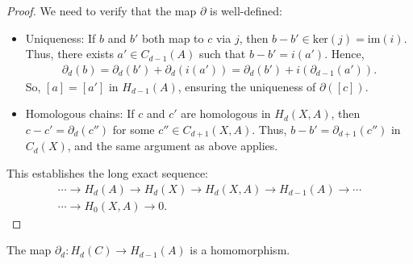 \begin{proof}
We need to verify that the map \(\partial\) is well-defined:
\begin{itemize}
    \item Uniqueness: If \(b\) and \(b'\) both map to \(c\) via \(j\), then \(b - b' \in \mathrm{ker}(j) = \mathrm{im}(i)\). Thus, there exists \(a' \in C_{d-1}(A)\) such that \(b - b' = i(a')\). Hence,
    \begin{align}
    \partial_{d}(b) = \partial_{d}(b') + \partial_{d}(i(a')) = \partial_{d}(b') + i(\partial_{d-1}(a')).
    \end{align}
    So, \([a] = [a']\) in \(H_{d-1}(A)\), ensuring the uniqueness of \(\partial([c])\).

    \item Homologous chains: If \(c\) and \(c'\) are homologous in \(H_{d}(X, A)\), then \(c - c' = \partial_{d}(c'')\) for some \(c'' \in C_{d+1}(X, A)\). Thus, \(b - b' = \partial_{d+1}(c'')\) in \(C_{d}(X)\), and the same argument as above applies.
\end{itemize}

This establishes the long exact sequence:
\begin{align}
\cdots \rightarrow H_{d}(A) \rightarrow H_{d}(X) \rightarrow H_{d}(X, A) \rightarrow H_{d-1}(A) \rightarrow \cdots \\
\cdots \rightarrow H_{0}(X, A) \rightarrow 0.
\end{align}
\end{proof}

\begin{proposition}
The map \(\partial_{d}: H_{d}(C) \rightarrow H_{d-1}(A)\) is a homomorphism.
\end{proposition}

